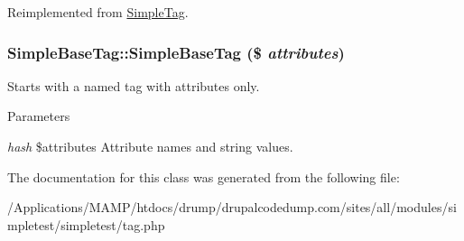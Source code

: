 Reimplemented from \hyperlink{class_simple_tag_a158fcbf8b82e7a6f7b6855c1dbe0715b}{SimpleTag}.\hypertarget{class_simple_base_tag_ac4f8adc4312874c21281e59ed7465354}{
\subsubsection[{SimpleBaseTag}]{\setlength{\rightskip}{0pt plus 5cm}SimpleBaseTag::SimpleBaseTag (\$ {\em attributes})}}
\label{class_simple_base_tag_ac4f8adc4312874c21281e59ed7465354}
Starts with a named tag with attributes only. 
\begin{DoxyParams}{Parameters}
\item[{\em hash}]\$attributes Attribute names and string values. \end{DoxyParams}


The documentation for this class was generated from the following file:\begin{DoxyCompactItemize}
\item 
/Applications/MAMP/htdocs/drump/drupalcodedump.com/sites/all/modules/simpletest/simpletest/tag.php\end{DoxyCompactItemize}
